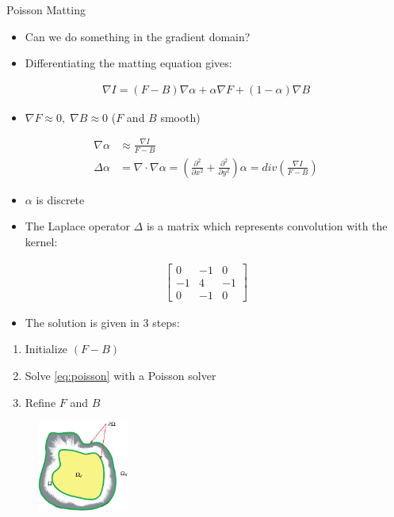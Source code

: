 \documentclass{beamer}
\begin{document}
\begin{frame}[allowframebreaks]{Poisson Matting \cite{sun2004poisson}}
 \begin{itemize}
  \item Can we do something in the gradient domain?
  \item Differentiating the  matting equation gives:
 \end{itemize}
 \begin{align}
  \nabla I = (F-B)\nabla \alpha + \alpha \nabla F + (1-\alpha) \nabla B
 \end{align}
 \begin{itemize}
  \item $\nabla F \approx 0,\; \nabla B \approx 0$ ($F$ and $B$ smooth)
 \end{itemize}
 \begin{align}
  \nabla \alpha &\approx \frac{\nabla I}{F-B}\\
  \Delta \alpha &= \nabla \cdot \nabla \alpha = \left(\frac{\partial^2}{\partial x^2} + \frac{\partial^2}{\partial y^2}\right) \alpha = div \left( \frac{\nabla I}{F-B} \right) \label{eq:poisson}
 \end{align}
 \begin{itemize}
  \item $\alpha$ is discrete
  \item The Laplace operator $\Delta$ is a matrix which represents convolution
        with the kernel:
 \end{itemize}
 \begin{align}
  \begin{bmatrix}
   0  & -1 & 0 \\
   -1 &  4 & -1 \\
   0  & -1 & 0
  \end{bmatrix}
 \end{align}
 \begin{itemize}
  \item The solution is given in 3 steps:
 \end{itemize}
 \begin{enumerate}
  \item Initialize $(F-B)$
  \item Solve \eqref{eq:poisson} with a Poisson solver
  \item Refine $F$ and $B$
 \end{enumerate}
 \begin{figure}
  \includegraphics[width=3cm]{images/poissonRegion.png}

\end{figure}
\end{frame}
\end{document}
